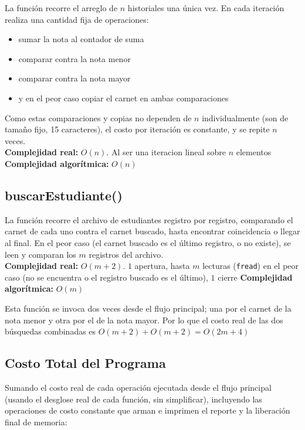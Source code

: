 \documentclass[12pt,letterpaper]{article}
\begin{document}
La función recorre el arreglo de $n$ historiales una única vez. En cada iteración realiza una cantidad fija de operaciones: 
\begin{itemize}
    \item sumar la nota al contador de suma
    \item comparar contra la nota menor
    \item comparar contra la nota mayor
    \item y en el peor caso copiar el carnet en ambas comparaciones
\end{itemize}
Como estas comparaciones y copias no dependen de $n$ individualmente (son de tamaño fijo, 15 caracteres), el costo por iteración es constante, y se repite $n$ veces.
\\[0.6cm]
\textbf{Complejidad real:} $O(n)$. Al ser una iteracion lineal sobre $n$ elementos
\newline
\textbf{Complejidad algorítmica:} $O(n)$

\subsection{buscarEstudiante()}

La función recorre el archivo de estudiantes registro por registro, comparando el carnet de cada uno contra el carnet buscado, hasta encontrar coincidencia o llegar al final. 
En el peor caso (el carnet buscado es el último registro, o no existe), se leen y comparan los $m$ registros del archivo.
\\[0.6cm]
\textbf{Complejidad real:} $O(m + 2)$. $1$ apertura, hasta $m$ lecturas (\texttt{fread}) en el peor caso (no se encuentra o el registro buscado es el último), $1$ cierre
\newline
\textbf{Complejidad algorítmica:} $O(m)$

Esta función se invoca dos veces desde el flujo principal; una por el carnet de la nota menor y otra por el de la nota mayor.
Por lo que el costo real de las dos búsquedas combinadas es $O(m+2) + O(m+2) = O(2m + 4)$

\subsection{Costo Total del Programa}

Sumando el costo real de cada operación ejecutada desde el flujo principal (usando el desglose real de cada función, sin simplificar), incluyendo las operaciones de costo constante que arman e imprimen el reporte y la liberación final de memoria:
\end{document}
